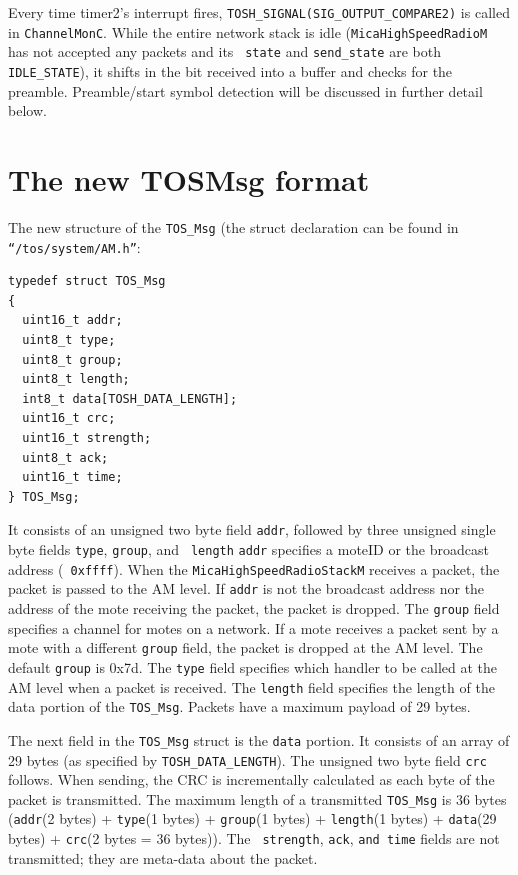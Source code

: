 \documentclass[11pt]{article}
\begin{document}
Every time timer2's interrupt fires, {\tt TOSH\_SIGNAL(SIG\_OUTPUT\_COMPARE2)}
is called in {\tt ChannelMonC}. While the entire network stack is idle
({\tt MicaHighSpeedRadioM} has not accepted any packets and its {\tt
state} and {\tt send\_state}
are both {\tt IDLE\_STATE}), it shifts in the bit received into a buffer and
checks for the preamble. Preamble/start symbol detection will be
discussed in further detail below.

\section*{The new TOSMsg format}
The new structure of the {\tt TOS\_Msg} (the struct declaration can be found
in {\tt ``/tos/system/AM.h''}:

\begin{verbatim}
typedef struct TOS_Msg
{
  uint16_t addr;
  uint8_t type;
  uint8_t group;
  uint8_t length;
  int8_t data[TOSH_DATA_LENGTH];
  uint16_t crc;
  uint16_t strength;
  uint8_t ack;
  uint16_t time;
} TOS_Msg;
\end{verbatim}

It consists of an unsigned two byte field {\tt addr}, followed by
three unsigned single byte fields {\tt type}, {\tt group}, and {\tt
length} {\tt addr} specifies a moteID or the broadcast address ({\tt
0xffff}).  When the {\tt MicaHighSpeedRadioStackM} receives a packet,
the packet is passed to the AM level. If {\tt addr} is not the broadcast
address nor the address of the mote receiving the packet, the packet
is dropped.  The {\tt group} field specifies a channel for motes on a
network. If a mote receives a packet sent by a mote with a different
{\tt group} field, the packet is dropped at the AM level. The default
{\tt group}
is 0x7d. The {\tt type} field specifies which handler to be called at
the AM level when a packet is received. The {\tt length} field
specifies the length of the data portion of the {\tt TOS\_Msg}. Packets have
a maximum payload of 29 bytes.

The next field in the {\tt TOS\_Msg} struct is the {\tt data} portion. It
consists of an array of 29 bytes (as specified by
{\tt TOSH\_DATA\_LENGTH}). The unsigned two byte field {\tt crc}
follows. When sending, the CRC is incrementally calculated as each
byte of the packet is transmitted. The maximum length of a transmitted
{\tt TOS\_Msg} is 36 bytes ({\tt addr}(2 bytes) + {\tt type}(1 bytes)
+ {\tt group}(1 bytes) +
{\tt length}(1 bytes) + {\tt data}(29 bytes) + {\tt crc}(2 bytes = 36 bytes)). The {\tt
strength}, {\tt ack}, {\tt and time} fields are not transmitted; they
are meta-data about the packet.
\end{document}
